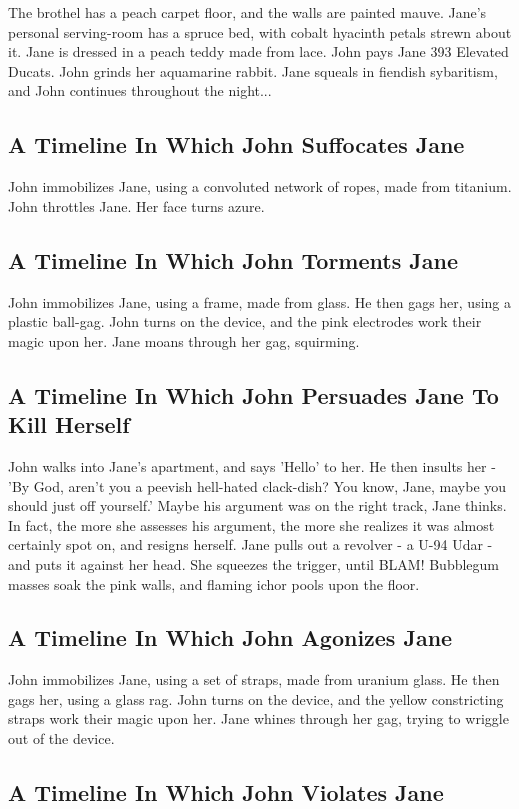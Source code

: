 \documentclass{article}
\begin{document}
The brothel has a peach carpet floor, and the walls are painted mauve.
Jane's personal serving{-}room has a spruce bed, with cobalt hyacinth petals strewn about it.
Jane is dressed in a peach teddy made from lace.
John pays Jane 393 Elevated Ducats.
John grinds her aquamarine rabbit.
Jane squeals in fiendish sybaritism, and John continues throughout the night...
\subsection{A Timeline In Which John Suffocates Jane}


John immobilizes Jane, using a convoluted network of ropes, made from titanium.
John throttles Jane.
Her face turns azure.
\subsection{A Timeline In Which John Torments Jane}


John immobilizes Jane, using a frame, made from glass.
He then gags her, using a plastic ball{-}gag.
John turns on the device, and the pink electrodes work their magic upon her.
Jane moans through her gag, squirming.
\subsection{A Timeline In Which John Persuades Jane To Kill Herself}


John walks into Jane's apartment, and says 'Hello' to her.
He then insults her {-} 'By God, aren't you a peevish hell{-}hated clack{-}dish?
You know, Jane, maybe you should just off yourself.'
Maybe his argument was on the right track, Jane thinks.
In fact, the more she assesses his argument, the more she realizes it was almost certainly spot on, and resigns herself.
Jane pulls out a revolver {-} a U{-}94 Udar {-} and puts it against her head.
She squeezes the trigger, until BLAM!
Bubblegum masses soak the pink walls, and flaming ichor pools upon the floor.
\subsection{A Timeline In Which John Agonizes Jane}


John immobilizes Jane, using a set of straps, made from uranium glass.
He then gags her, using a glass rag.
John turns on the device, and the yellow constricting straps work their magic upon her.
Jane whines through her gag, trying to wriggle out of the device.
\subsection{A Timeline In Which John Violates Jane}
\end{document}
